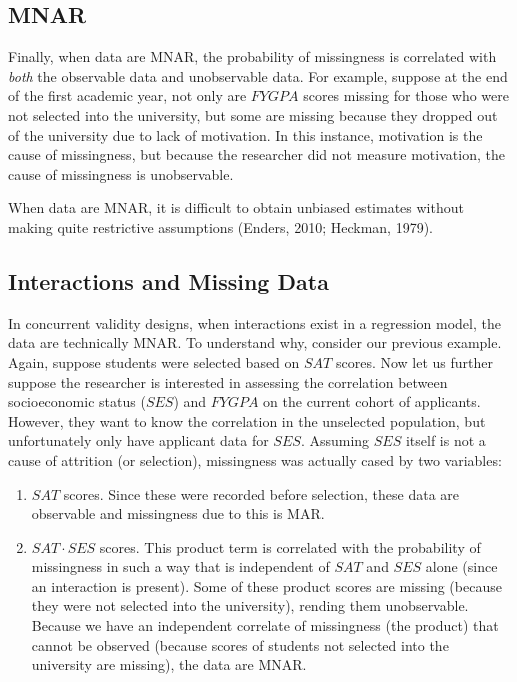 \documentclass[english,man]{apa6}
\providecommand{\tightlist}{%
  \setlength{\itemsep}{0pt}\setlength{\parskip}{0pt}}
\theoremstyle{definition}
\theoremstyle{definition}
\theoremstyle{remark}
\begin{document}
\subsection{MNAR}\label{mnar}

Finally, when data are MNAR, the probability of missingness is
correlated with \emph{both} the observable data and unobservable data.
For example, suppose at the end of the first academic year, not only are
\(FYGPA\) scores missing for those who were not selected into the
university, but some are missing because they dropped out of the
university due to lack of motivation. In this instance, motivation is
the cause of missingness, but because the researcher did not measure
motivation, the cause of missingness is unobservable.

When data are MNAR, it is difficult to obtain unbiased estimates without
making quite restrictive assumptions (Enders, 2010; Heckman, 1979).

\subsection{Interactions and Missing
Data}\label{interactions-and-missing-data}

In concurrent validity designs, when interactions exist in a regression
model, the data are technically MNAR. To understand why, consider our
previous example. Again, suppose students were selected based on \(SAT\)
scores. Now let us further suppose the researcher is interested in
assessing the correlation between socioeconomic status (\(SES\)) and
\(FYGPA\) on the current cohort of applicants. However, they want to
know the correlation in the unselected population, but unfortunately
only have applicant data for \(SES\). Assuming \(SES\) itself is not a
cause of attrition (or selection), missingness was actually cased by two
variables:

\begin{enumerate}
\def\labelenumi{(\arabic{enumi})}
\tightlist
\item
  \(SAT\) scores. Since these were recorded before selection, these data
  are observable and missingness due to this is MAR.
\item
  \(SAT\cdot SES\) scores. This product term is correlated with the
  probability of missingness in such a way that is independent of
  \(SAT\) and \(SES\) alone (since an interaction is present). Some of
  these product scores are missing (because they were not selected into
  the university), rending them unobservable. Because we have an
  independent correlate of missingness (the product) that cannot be
  observed (because scores of students not selected into the university
  are missing), the data are MNAR.
\end{enumerate}
\end{document}
